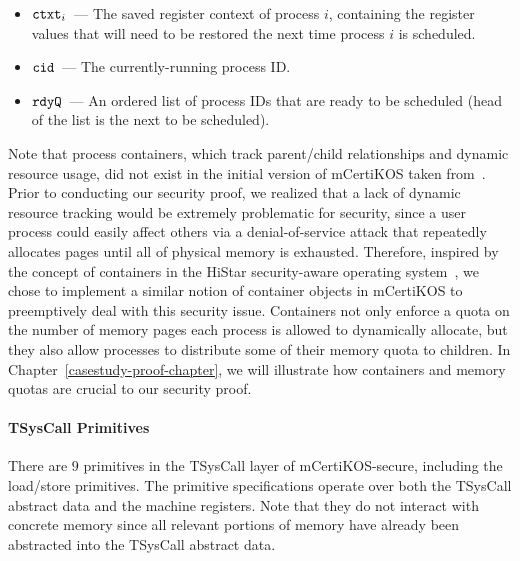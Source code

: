 \begin{itemize}
\item $\text{\tt{ctxt}}_i$~--- The saved register context of 
process $i$, containing the register values that will need to 
be restored the next time process $i$ is scheduled.
\item $\text{\tt{cid}}$~--- The currently-running process ID.
\ifextended
\item $\text{\tt{rdyQ}}$~--- An ordered list of process IDs that are
ready to be scheduled (head of the list is the next to be scheduled).
\else\fi
\end{itemize}

\noindent
Note that process containers, which track parent/child relationships
and dynamic resource usage, did not exist in the initial version of 
mCertiKOS taken from~\cite{certikos-popl}. Prior to conducting
our security proof, we realized that a lack of dynamic resource
tracking would be extremely problematic for security, since a
user process could easily affect others via a denial-of-service
attack that repeatedly allocates pages until all of physical memory
is exhausted. Therefore, inspired by the concept of containers
in the HiStar security-aware operating system~\cite{histar}, we
chose to implement a similar notion of container objects in 
mCertiKOS to preemptively deal with this security issue. Containers
not only enforce a quota on the number of memory pages each process 
is allowed to dynamically allocate, but they also allow processes to
distribute some of their memory quota to children. In 
Chapter~\ref{casestudy-proof-chapter}, we will illustrate  
how containers and memory quotas are crucial to our security proof.

\paragraph{TSysCall Primitives}
There are $9$ primitives in the TSysCall layer of mCertiKOS-secure, including the
load/store primitives. The primitive specifications operate over
both the TSysCall abstract data and the machine registers.
Note that they do not interact with concrete memory since all 
relevant portions of memory have already been abstracted
into the TSysCall abstract data.

